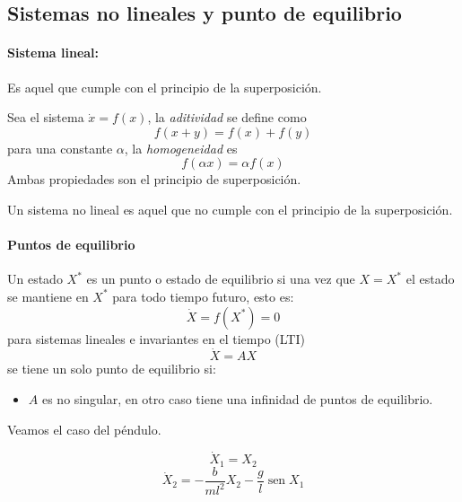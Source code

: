 \begin{flushright}
\end{flushright}

\subsection{Sistemas no lineales y punto de equilibrio}

\paragraph{Sistema lineal:}
Es aquel que cumple con el principio de la superposición.

Sea el sistema $\dot{x}=f(x)$, la \textit{aditividad} se define como
\[
  f(x+y)=f(x)+f(y)
\]
para una constante $\alpha$, la \textit{homogeneidad} es
\[
  f(\alpha x)=\alpha f(x)
\]
Ambas propiedades son el principio de superposición.

Un sistema no lineal es aquel que no cumple con el principio de la
superposición.

\paragraph{Puntos de equilibrio}
Un estado $X^{*}$ es un punto o estado de equilibrio si una vez que $X=X^{*}$
el estado se mantiene en $X^{*}$ para todo tiempo futuro, esto es:
\[
  \dot{X}=f(X^{*})=0
\]
para sistemas lineales e invariantes en el tiempo (LTI)
\[
  \dot{X}=AX
\]
se tiene un solo punto de equilibrio si:

\begin{itemize}
  \item $A$ es no singular, en otro caso tiene una infinidad de puntos de
    equilibrio.
\end{itemize}

Veamos el caso del péndulo.

\begin{center}
  \qquad
  \begin{minipage}{0.46\textwidth}
    \[
      \dot{X}_1=X_2
    \]
    \[
      \dot{X}_2=-\frac{b}{ml^2}X_2
      -\frac{g}{l}\operatorname{sen}X_1
    \]
  \end{minipage}
\end{center}

